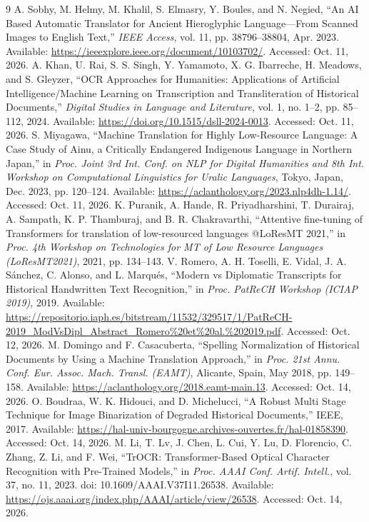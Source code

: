 \documentclass[10pt,twocolumn]{article}
\begin{document}
\begin{thebibliography}{9}\small\setlength{\itemsep}{1pt}
 A. Sobhy, M. Helmy, M. Khalil, S. Elmasry, Y. Boules, and N. Negied, ``An AI Based Automatic Translator for Ancient Hieroglyphic Language---From Scanned Images to English Text,'' \emph{IEEE Access}, vol. 11, pp. 38796--38804, Apr. 2023. Available: \url{https://ieeexplore.ieee.org/document/10103702/}. Accessed: Oct. 11, 2026.
 A. Khan, U. Rai, S. S. Singh, Y. Yamamoto, X. G. Ibarreche, H. Meadows, and S. Gleyzer, ``OCR Approaches for Humanities: Applications of Artificial Intelligence/Machine Learning on Transcription and Transliteration of Historical Documents,'' \emph{Digital Studies in Language and Literature}, vol. 1, no. 1--2, pp. 85--112, 2024. Available: \url{https://doi.org/10.1515/dsll-2024-0013}. Accessed: Oct. 11, 2026.
 S. Miyagawa, ``Machine Translation for Highly Low-Resource Language: A Case Study of Ainu, a Critically Endangered Indigenous Language in Northern Japan,'' in \emph{Proc. Joint 3rd Int. Conf. on NLP for Digital Humanities and 8th Int. Workshop on Computational Linguistics for Uralic Languages}, Tokyo, Japan, Dec. 2023, pp. 120--124. Available: \url{https://aclanthology.org/2023.nlp4dh-1.14/}. Accessed: Oct. 11, 2026.
 K. Puranik, A. Hande, R. Priyadharshini, T. Durairaj, A. Sampath, K. P. Thamburaj, and B. R. Chakravarthi, ``Attentive fine-tuning of Transformers for translation of low-resourced languages @LoResMT 2021,'' in \emph{Proc. 4th Workshop on Technologies for MT of Low Resource Languages (LoResMT2021)}, 2021, pp. 134--143.
 V. Romero, A. H. Toselli, E. Vidal, J. A. S\'anchez, C. Alonso, and L. Marqu\'es, ``Modern vs Diplomatic Transcripts for Historical Handwritten Text Recognition,'' in \emph{Proc. PatReCH Workshop (ICIAP 2019)}, 2019. Available: \url{https://repositorio.iaph.es/bitstream/11532/329517/1/PatReCH-2019_ModVsDipl_Abstract_Romero%20et%20al.%202019.pdf}. Accessed: Oct. 12, 2026.
 M. Domingo and F. Casacuberta, ``Spelling Normalization of Historical Documents by Using a Machine Translation Approach,'' in \emph{Proc. 21st Annu. Conf. Eur. Assoc. Mach. Transl. (EAMT)}, Alicante, Spain, May 2018, pp. 149--158. Available: \url{https://aclanthology.org/2018.eamt-main.13}. Accessed: Oct. 14, 2026.
 O. Boudraa, W. K. Hidouci, and D. Michelucci, ``A Robust Multi Stage Technique for Image Binarization of Degraded Historical Documents,'' IEEE, 2017. Available: \url{https://hal-univ-bourgogne.archives-ouvertes.fr/hal-01858390}. Accessed: Oct. 14, 2026.
 M. Li, T. Lv, J. Chen, L. Cui, Y. Lu, D. Florencio, C. Zhang, Z. Li, and F. Wei, ``TrOCR: Transformer-Based Optical Character Recognition with Pre-Trained Models,'' in \emph{Proc. AAAI Conf. Artif. Intell.}, vol. 37, no. 11, 2023. doi: 10.1609/AAAI.V37I11.26538. Available: \url{https://ojs.aaai.org/index.php/AAAI/article/view/26538}. Accessed: Oct. 14, 2026.
\end{thebibliography}
\end{document}
